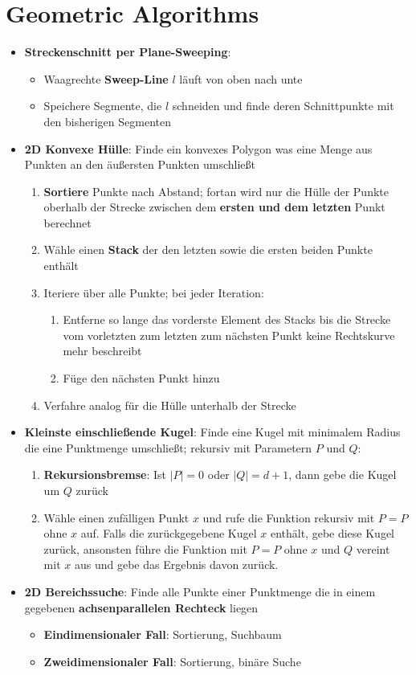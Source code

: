 \section{Geometric Algorithms}%
\label{ga:sec:geometric_algorithms}

\begin{itemize}
	\item \textbf{Streckenschnitt per Plane-Sweeping}:
	\begin{itemize}
		\item Waagrechte \textbf{Sweep-Line} $l$ läuft von oben nach unte
		\item Speichere Segmente, die $l$ schneiden und finde deren Schnittpunkte mit den bisherigen Segmenten
	\end{itemize}
	\item \textbf{2D Konvexe Hülle}: Finde ein konvexes Polygon was eine Menge aus Punkten an den äußersten Punkten umschließt
	\begin{enumerate}
		\item \textbf{Sortiere} Punkte nach Abstand; fortan wird nur die Hülle der Punkte oberhalb der Strecke zwischen dem \textbf{ersten und dem letzten} Punkt berechnet
		\item Wähle einen \textbf{Stack} der den letzten sowie die ersten beiden Punkte enthält
		\item Iteriere über alle Punkte; bei jeder Iteration:
		\begin{enumerate}
			\item Entferne so lange das vorderste Element des Stacks bis die Strecke vom vorletzten zum letzten zum nächsten Punkt keine Rechtskurve mehr beschreibt
			\item Füge den nächsten Punkt hinzu
		\end{enumerate}
		\item Verfahre analog für die Hülle unterhalb der Strecke
	\end{enumerate}
	\item \textbf{Kleinste einschließende Kugel}: Finde eine Kugel mit minimalem Radius die eine Punktmenge umschließt; rekursiv mit Parametern $P$ und $Q$:
	\begin{enumerate}
		\item \textbf{Rekursionsbremse}: Ist $|P| = 0$ oder $|Q| = d + 1$, dann gebe die Kugel um $Q$ zurück
		\item Wähle einen zufälligen Punkt $x$ und rufe die Funktion rekursiv mit $P = P$ ohne $x$ auf. Falls die zurückgegebene Kugel $x$ enthält, gebe diese Kugel zurück, ansonsten führe die Funktion mit $P = P$ ohne $x$ und $Q$ vereint mit $x$ aus und gebe das Ergebnis davon zurück.
	\end{enumerate}
	\item \textbf{2D Bereichssuche}: Finde alle Punkte einer Punktmenge die in einem gegebenen \textbf{achsenparallelen Rechteck} liegen
	\begin{itemize}
		\item \textbf{Eindimensionaler Fall}: Sortierung, Suchbaum
		\item \textbf{Zweidimensionaler Fall}: Sortierung, binäre Suche
	\end{itemize}
\end{itemize}